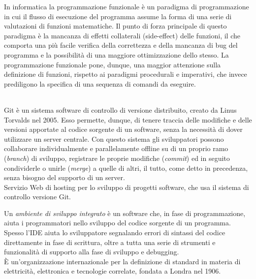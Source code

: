\documentclass{scalatekids-article}
\begin{document}
 In informatica la programmazione funzionale è un paradigma di programmazione in cui il flusso di esecuzione del programma assume la forma di una serie di valutazioni di funzioni matematiche. Il punto di forza principale di questo paradigma è la mancanza di effetti collaterali (side-effect) delle funzioni, il che comporta una più facile verifica della correttezza e della mancanza di bug del programma e la possibilità di una maggiore ottimizzazione dello stesso.
  La programmazione funzionale pone, dunque, una maggior attenzione sulla definizione di funzioni, rispetto ai paradigmi procedurali e imperativi, che invece prediligono la specifica di una sequenza di comandi da eseguire.
  \\
\\


 Git è un sistema software di controllo di versione distribuito, creato da Linus Torvalds nel 2005.
Esso permette, dunque, di tenere traccia delle modifiche e delle versioni apportate al codice sorgente di un software, senza la necessità di dover utilizzare un server centrale.
Con questo sistema gli sviluppatori possono collaborare individualmente e parallelamente offline su di un proprio ramo (\textit{branch}) di sviluppo, registrare le proprie modifiche (\textit{commit}) ed in seguito condividerle o unirle (\textit{merge}) a quelle di altri, il tutto, come detto in precedenza, senza bisogno del supporto di un server.
\\

 Servizio Web di hosting per lo sviluppo di progetti software, che usa il sistema di controllo  versione Git.
\\



 Un \textit{ambiente di sviluppo integrato} è un software che, in fase di programmazione, aiuta i programmatori nello sviluppo del codice sorgente di un programma. Spesso l'IDE aiuta lo sviluppatore segnalando errori di sintassi del codice direttamente in fase di scrittura, oltre a tutta una serie di strumenti e funzionalità di supporto alla fase di sviluppo e debugging.
\\

 È un'organizzazione internazionale per la definizione di standard in materia di elettricità, elettronica e tecnologie correlate, fondata a Londra nel 1906.
\\
\end{document}
